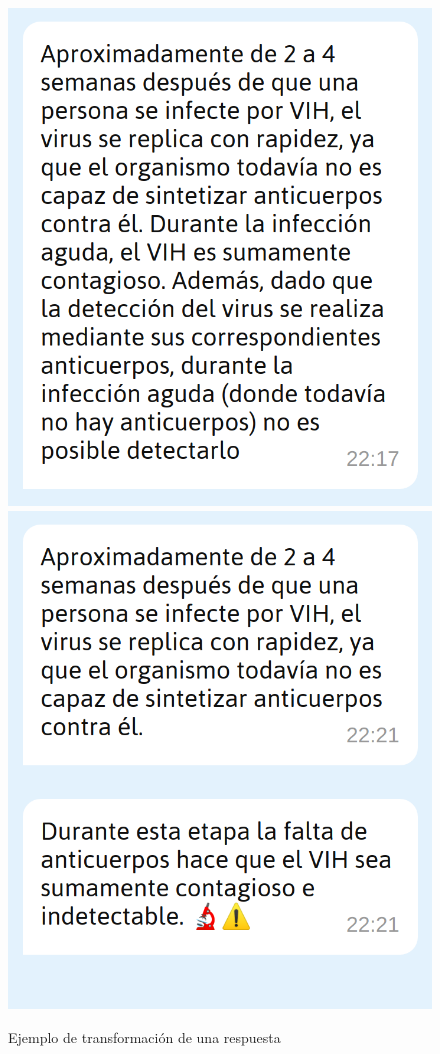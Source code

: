 \begin{figure}[htbp]
\centering
\includegraphics[scale=0.3]{../images/original_response.png}
\includegraphics[scale=0.3]{../images/modified_response.png}
\caption{Ejemplo de transformación de una respuesta}
\label{fig:modified response}
\end{figure}

